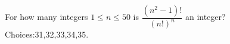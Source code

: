 For how many integers $1\le n\le50$ is $\dfrac{(n^2-1)!}{(n!)^n}$ an integer? Choices:31,32,33,34,35.
